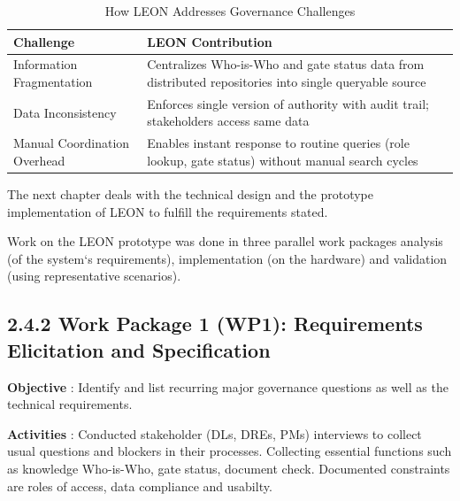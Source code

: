 \begin{table}[!htbp]
\centering
\small
\setlength{\tabcolsep}{8pt}
\renewcommand{\arraystretch}{1.8}
\caption{How LEON Addresses Governance Challenges}
\begin{tabularx}{\textwidth}{|>{\raggedright\arraybackslash}X|>{\raggedright\arraybackslash}X|}
\hline
\cellcolor[HTML]{E6F2FF}\textcolor[HTML]{003D99}{\textbf{Challenge}} & \cellcolor[HTML]{E6F2FF}\textcolor[HTML]{003D99}{\textbf{LEON Contribution}} \\
\hline
Information Fragmentation & Centralizes Who-is-Who and gate status data from distributed repositories into single queryable source \\
\hline
Data Inconsistency & Enforces single version of authority with audit trail; stakeholders access same data \\
\hline
Manual Coordination Overhead & Enables instant response to routine queries (role lookup, gate status) without manual search cycles \\
\hline
\end{tabularx}
\label{tab:leon-challenges}
\end{table}

The next chapter deals with the technical design and the prototype implementation of LEON to fulfill the requirements stated.
\FloatBarrier

Work on the LEON prototype was done in three parallel work packages analysis (of the system‘s requirements), implementation (on the hardware) and validation (using representative scenarios).
\vspace{0.5cm}

\subsection*{\textcolor[HTML]{003D99}{2.4.2 Work Package 1 (WP1): Requirements Elicitation and Specification}}

\noindent\textbf{Objective} : Identify and list recurring major governance questions as well as the technical requirements.

\vspace{0.2cm}

\noindent\textbf{Activities} : Conducted stakeholder (DLs, DREs, PMs) interviews to collect usual questions and blockers in their processes. Collecting essential functions such as knowledge Who-is-Who, gate status, document check. Documented constraints are roles of access, data compliance and usabilty.

